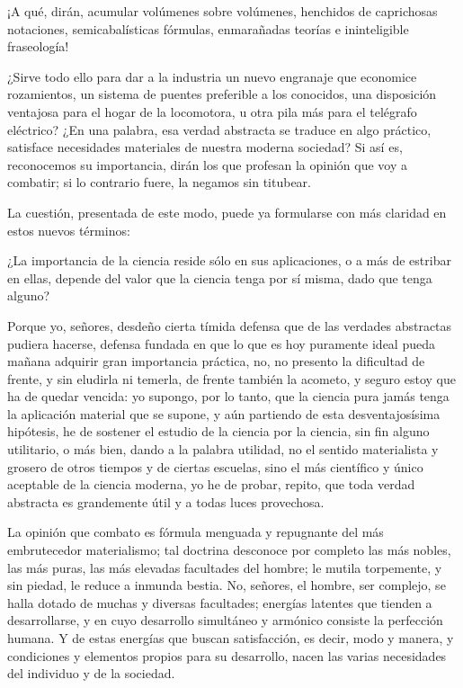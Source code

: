 \documentclass[a4paper, 12pt]{article}
\begin{document}
{{{¡A qué, dirán, acumular volúmenes sobre volúmenes, henchidos de caprichosas notaciones, semicabalísticas fórmulas, enmarañadas teorías e ininteligible fraseología!

¿Sirve todo ello para dar a la industria un nuevo engranaje que economice rozamientos, un sistema de puentes preferible a los conocidos, una disposición ventajosa para el hogar de la locomotora, u otra pila más para el telégrafo eléctrico? ¿En una palabra, esa verdad abstracta se traduce en algo práctico, satisface necesidades materiales de nuestra moderna sociedad?  Si así es, reconocemos su importancia, dirán los que profesan la opinión que voy a combatir; si lo contrario fuere, la negamos sin titubear.

La cuestión, presentada de este modo, puede ya formularse con más claridad en estos nuevos términos:

¿La importancia de la ciencia reside sólo en sus aplicaciones, o a más de estribar en ellas, depende del valor que la ciencia tenga por sí misma, dado que tenga alguno?

Porque yo, señores, desdeño cierta tímida defensa que de las verdades abstractas pudiera hacerse, defensa fundada en que lo que es hoy puramente ideal pueda mañana adquirir gran importancia práctica, no, no presento la dificultad de frente, y sin eludirla ni temerla, de frente también la acometo, y seguro estoy que ha de quedar vencida: yo supongo, por lo tanto, que la ciencia pura jamás tenga la aplicación material que se supone, y aún partiendo de esta desventajosísima hipótesis, he de sostener el estudio de la ciencia por la ciencia, sin fin alguno utilitario, o más bien, dando a la palabra utilidad, no el sentido materialista y grosero de otros tiempos y de ciertas escuelas, sino el más científico y único aceptable de la ciencia moderna, yo he de probar, repito, que toda verdad abstracta es grandemente útil y a todas luces provechosa.

La opinión que combato es fórmula menguada y repugnante del más embrutecedor materialismo; tal doctrina desconoce por completo las más nobles, las más puras, las más elevadas facultades del hombre; le mutila torpemente, y sin piedad, le reduce a inmunda bestia.  No, señores, el hombre, ser complejo, se halla dotado de muchas y diversas facultades; energías latentes que tienden a desarrollarse, y en cuyo desarrollo simultáneo y armónico consiste la perfección humana.  Y de estas energías que buscan satisfacción, es decir, modo y manera, y condiciones y elementos propios para su desarrollo, nacen las varias necesidades del individuo y de la sociedad.

}}}
\end{document}
